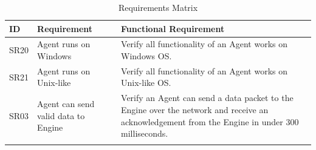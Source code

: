 \documentclass[letterpaper,12pt,oneside,listof=totoc]{scrreprt}
\begin{document}
\begin{longtable}{ p{} |  p{} | p{} }
    \hline
   \textbf{ID} & \textbf{Requirement} & \textbf{Functional Requirement} \\
    \hline
    SR20 & Agent runs on Windows & Verify all functionality of an Agent works on Windows OS.\\
    \hline
    SR21 & Agent runs on Unix-like & Verify all functionality of an Agent works on Unix-like OS.\\
    \hline
    SR03 & Agent can send valid data to Engine & Verify an Agent can send a data packet to the Engine over the network and receive an
    acknowledgement from the Engine in under 300 milliseconds. \\
    \hline
    
\caption{Requirements Matrix}
\label{ReqMatrix}
\end{longtable}
\end{document}

